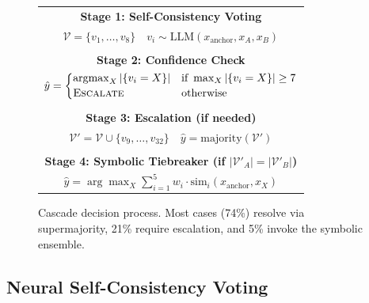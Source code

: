 \documentclass[11pt]{article}
\begin{document}
\begin{figure}[!htb]
\centering
\small
\setlength{\tabcolsep}{3pt}
\begin{tabular}{c}
\textbf{Stage 1: Self-Consistency Voting} \\[4pt]
$\mathcal{V} = \{v_1, \ldots, v_8\} \quad v_i \sim \text{LLM}(x_{\text{anchor}}, x_A, x_B)$ \\[6pt]
\hline \\[-6pt]
\textbf{Stage 2: Confidence Check} \\[6pt]
{\scriptsize$\hat{y} = \left\{
\begin{array}{@{}ll@{}}
\operatorname*{argmax}_{X} |\{v_i = X\}| & \text{if } \max_X |\{v_i = X\}| \geq 7 \\[2pt]
\textsc{Escalate} & \text{otherwise}
\end{array}
\right.$} \\[12pt]
\hline \\[-6pt]
\textbf{Stage 3: Escalation (if needed)} \\[4pt]
$\mathcal{V}' = \mathcal{V} \cup \{v_9, \ldots, v_{32}\} \quad \hat{y} = \text{majority}(\mathcal{V}')$ \\[6pt]
\hline \\[-6pt]
\textbf{Stage 4: Symbolic Tiebreaker (if $|\mathcal{V}'_A| = |\mathcal{V}'_B|$)} \\[4pt]
$\hat{y} = \arg\max_X \sum_{i=1}^{5} w_i \cdot \text{sim}_i(x_{\text{anchor}}, x_X)$
\end{tabular}

\vspace{6pt}
\caption{Cascade decision process. Most cases (74\%) resolve via supermajority, 21\% require escalation, and 5\% invoke the symbolic ensemble.}
\label{fig:architecture}
\end{figure}

\subsection{Neural Self-Consistency Voting}
\end{document}
